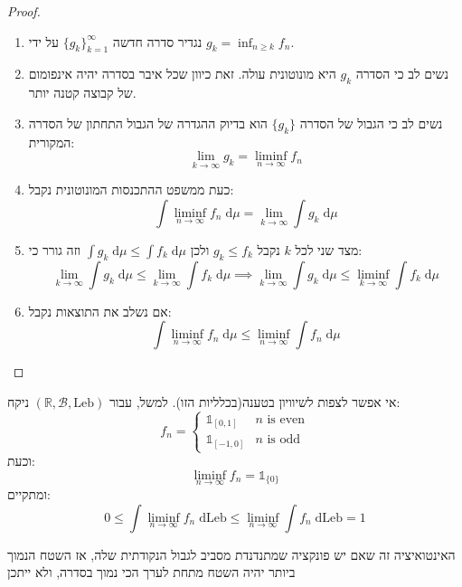 \documentclass{tstextbook}
\begin{document}
\begin{proof}
  \begin{enumerate}
    \item נגדיר סדרה חדשה \(\{ g_{k} \}_{k=1}^{\infty}\) על ידי \(g_{k}=\inf_{n\geq k}f_{n}\). 


    \item נשים לב כי הסדרה \(g_{k}\) היא מונוטונית עולה. זאת כיוון שכל איבר בסדרה יהיה אינפומום של קבוצה קטנה יותר. 


    \item נשים לב כי הגבול של הסדרה \(\{ g_{k} \}\) הוא בדיוק ההגדרה של הגבול התחתון של הסדרה המקורית: 
$$\lim_{ k \to \infty } g_{k}=\liminf_{ n \to \infty } f_{n} $$


    \item כעת ממשפט ההתכנסות המונוטונית נקבל: 
$$\int \liminf_{ n \to \infty } f_{n} \;\mathrm{d} \mu = \lim_{ k \to \infty } \int g_{k} \;\mathrm{d} \mu  $$


    \item מצד שני לכל \(k\) נקבל \(g_{k}\leq f_{k}\) ולכן \(\int g_{k} \;\mathrm{d} \mu \leq \int f_{k} \;\mathrm{d} \mu\) וזה גורר כי: 
$$\lim_{ k \to \infty } \int g_{k} \;\mathrm{d} \mu \leq \lim_{ k \to \infty }   \int f_{k} \;\mathrm{d} \mu \implies \lim_{ k \to \infty } \int g_{k} \;\mathrm{d} \mu \leq \liminf_{ k \to \infty }   \int f_{k} \;\mathrm{d} \mu $$


    \item אם נשלב את התוצאות נקבל: 
$$\int \liminf_{ n \to \infty }  f_{n}\;\mathrm{d} \mu \leq \liminf_{ n \to \infty } \int f_{n} \;\mathrm{d} \mu   $$


  \end{enumerate}
\end{proof}
\begin{remark}
אי אפשר לצפות לשיוויון בטענה(בכלליות הזו). למשל, עבור \(\left( \mathbb{R},\mathcal{B},\text{Leb} \right)\) ניקח:
$$f_{n}= \begin{cases} \mathbb{1}  _{[0,1]} & n\text{ is even} \\\mathbb{1} _{[-1,0]} & n\text{ is odd} 
\end{cases}$$
וכעת:
$$\liminf_{ n \to \infty } f_{n} = \mathbb{1} _{\{ 0 \}}$$
ומתקיים:
$$0\leq \int  \liminf_{ n \to \infty }  f_{n}\;\mathrm{d} \text{Leb} \leq \liminf_{ n \to \infty } \int f_{n} \;\mathrm{d} \text{Leb}=1  $$

\end{remark}
\begin{remark}
האינטואיציה זה שאם יש פונקציה שמתנדנדת מסביב לגבול הנקודתית שלה, אז השטח הנמוך ביותר יהיה השטח מתחת לערך הכי נמוך בסדרה, ולא ייתכן

\end{remark}
\end{document}
